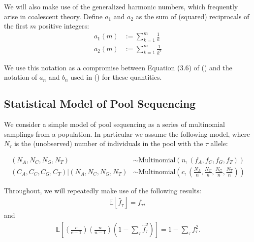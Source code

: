 \documentclass[a4paper,fontsize=9pt,DIV=14]{scrartcl}
\newcommand\citeay[1]{\citeauthor{#1} (\citeyear{#1}) \cite{#1}}
\newcommand{\samplesize}{n}
\newcommand{\coverage}{c}
\newcommand{\empfreq}{\widehat{f}}
\begin{document}
We will also make use of the generalized harmonic numbers, which frequently arise in coalescent theory.   Define $a_1$ and $a_2$
as the sum of (squared) reciprocals of the first $m$ positive integers:
%
\begin{align}
    \label{eq:an}
    a_1(m) &:= \sum_{k=1}^{m} \frac{1}{k}
    \\
    \label{eq:bn}
    a_2(m) &:= \sum_{k=1}^{m} \frac{1}{k^2}
\end{align}
%


We use this notation as a compromise between Equation (3.6) of \citeay{Hahn2018} and the notation of $a_n$ and $b_n$ used in \citeay{Achaz2008} for these quantities.

\subsection{Statistical Model of Pool Sequencing}
\label{supp:sec:model}

We consider a simple model of pool sequencing as a series of multinomial samplings from a population.  In particular we assume the following model, where $N_\tau$ is the (unobserved) number of individuals in the pool with the $\tau$ allele:

\begin{align*}
(N_A, N_C, N_G, N_T) &\sim \text{Multinomial}\left(\samplesize, (f_A, f_C, f_G, f_T)\right)\\
(C_A, C_C, C_G, C_T) | (N_A, N_C, N_G, N_T) &\sim \text{Multinomial}\left(\coverage, \left(\frac{N_A}{\samplesize}, \frac{N_C}{\samplesize},\frac{N_G}{\samplesize},\frac{N_T}{\samplesize}\right)\right)
\end{align*}

Throughout, we will repeatedly make use of the following results:
\begin{align}
\mathbb{E}\left[\empfreq_\tau\right] = f_\tau, \label{eq:frequnbiased}
\end{align}
and
\begin{align}
\mathbb{E}\left[\left(\frac{\coverage}{\coverage-1}\right)\left(\frac{\samplesize}{\samplesize-1}\right)\left(1-\sum_\tau\empfreq_\tau^2\right)\right] = 1-\sum_\tau f_\tau^2. \label{eq:hetunbiased}
\end{align}
\end{document}
